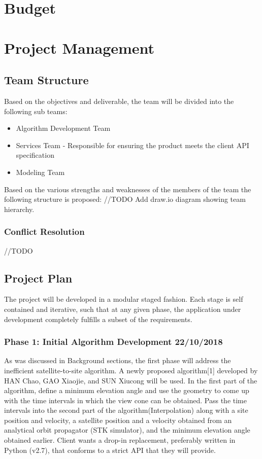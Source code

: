 \documentclass[12pt]{article}
\begin{document}
\newpage
\section*{Budget}

\newpage
\section*{Project Management}

\subsection*{Team Structure}
Based on the objectives and deliverable, the team will be divided into the following sub teams:
\begin{itemize}
    \item Algorithm Development Team
    \item Services Team - Responsible for ensuring the product meets the client API specification
    \item Modeling Team
\end{itemize}

Based on the various strengths and weaknesses of the members of the team the following structure is proposed:
//TODO Add draw.io diagram showing team hierarchy.

\subsubsection*{Conflict Resolution}
//TODO

\subsection*{Project Plan}
The project will be developed in a modular staged fashion. Each stage is self contained and iterative, such that at any given phase, the application under development completely fulfills a subset of the requirements. 

\subsubsection*{Phase 1: Initial Algorithm Development \hfill 22/10/2018}
As was discussed in Background sections, the first  phase will address the inefficient satellite-to-site algorithm. A newly proposed algorithm[1] developed by HAN Chao, GAO Xiaojie, and SUN Xiucong will be used. 
In the first part of the algorithm, define a minimum elevation angle and use the geometry to come up with the time intervals in which the view cone can be obtained.
Pass the time intervals into the second part of the algorithm(Interpolation) along with a site position and velocity, a satellite position and a velocity obtained from an analytical orbit propagator (STK simulator), and the minimum elevation angle obtained earlier.
Client wants a drop-in replacement, preferably written in Python (v2.7), that conforms to a strict API that they will provide.
\end{document}
